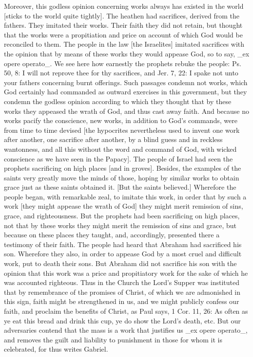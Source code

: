 Moreover, this godless opinion concerning works always has existed in
the world [sticks to the world quite tightly].  The heathen had
sacrifices, derived from the fathers.  They imitated their works.
Their faith they did not retain, but thought that the works were a
propitiation and price on account of which God would be reconciled to
them.  The people in the law [the Israelites] imitated sacrifices
with the opinion that by means of these works they would appease God,
so to say, _ex opere operato_.  We see here how earnestly the
prophets rebuke the people: Ps. 50, 8: I will not reprove thee for
thy sacrifices, and Jer. 7, 22: I spake not unto your fathers
concerning burnt offerings.  Such passages condemn not works, which
God certainly had commanded as outward exercises in this government,
but they condemn the godless opinion according to which they thought
that by these works they appeased the wrath of God, and thus cast
away faith.  And because no works pacify the conscience, new works,
in addition to God's commands, were from time to time devised [the
hypocrites nevertheless used to invent one work after another, one
sacrifice after another, by a blind guess and in reckless wantonness,
and all this without the word and command of God, with wicked
conscience as we have seen in the Papacy].  The people of Israel had
seen the prophets sacrificing on high places [and in groves].
Besides, the examples of the saints very greatly move the minds of
those, hoping by similar works to obtain grace just as these saints
obtained it.  [But the saints believed.] Wherefore the people began,
with remarkable zeal, to imitate this work, in order that by such a
work [they might appease the wrath of God] they might merit remission
of sins, grace, and righteousness.  But the prophets had been
sacrificing on high places, not that by these works they might merit
the remission of sins and grace, but because on these places they
taught, and, accordingly, presented there a testimony of their faith.
The people had heard that Abraham had sacrificed his son.  Wherefore
they also, in order to appease God by a most cruel and difficult work,
put to death their sons.  But Abraham did not sacrifice his son with
the opinion that this work was a price and propitiatory work for the
sake of which he was accounted righteous.  Thus in the Church the
Lord's Supper was instituted that by remembrance of the promises of
Christ, of which we are admonished in this sign, faith might be
strengthened in us, and we might publicly confess our faith, and
proclaim the benefits of Christ, as Paul says, 1 Cor. 11, 26: As
often as ye eat this bread and drink this cup, ye do show the Lord's
death, etc. But our adversaries contend that the mass is a work that
justifies us _ex opere operato_, and removes the guilt and liability
to punishment in those for whom it is celebrated, for thus writes
Gabriel.

